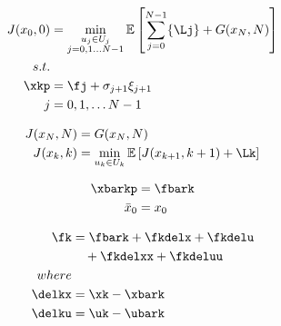 \documentclass[varwidth]{standalone}
\providecommand{\Jzero}{J(x_0, 0)}
\providecommand{\Jk}{J(x_k, k)}
\providecommand{\JN}{J(x_N, N)}
\providecommand{\Jkp}{J(x_{k+1}, k+1)}
\providecommand{\GN}{G(x_N, N)}
\providecommand{\noisejp}{\sigma_{j+1} \xi_{j+1}}
\begin{document}
\begin{minipage}{0.8\linewidth}

    \begin{align}
        \Jzero &= \min_{
            \substack{
                u_j \in U_j \\
                j = 0, 1 \dots N-1 \\
            }
        }
        \mathbb{E} \left[ \sum_{j=0}^{N-1} \{\Lj\} + \GN\right] \nonumber\\
        s.t. &{} \\
        \xkp &= \fj + \noisejp \nonumber\\
        j &= 0, 1, \dots N-1 \nonumber
    \end{align}

    \begin{align}
        \JN &= \GN  \\
        \Jk &= \min_{u_k \in U_k} \mathbb{E} \left[ 
            \Jkp + \Lk 
        \right]
    \end{align}

    \begin{align}
        \xbarkp &= \fbark \\
        \bar{x}_0 &= x_0 \nonumber \\
    \end{align}

    \begin{align}
        {\fk} &= {\fbark + \fkdelx + \fkdelu} \\
        {}  &\quad + {\fkdelxx + \fkdeluu} \nonumber\\
        {where} & {}\nonumber\\
        {\delkx} &= {\xk - \xbark} \nonumber\\
        {\delku} &= {\uk - \ubark} \nonumber
    \end{align}
\end{minipage}
\end{document}
